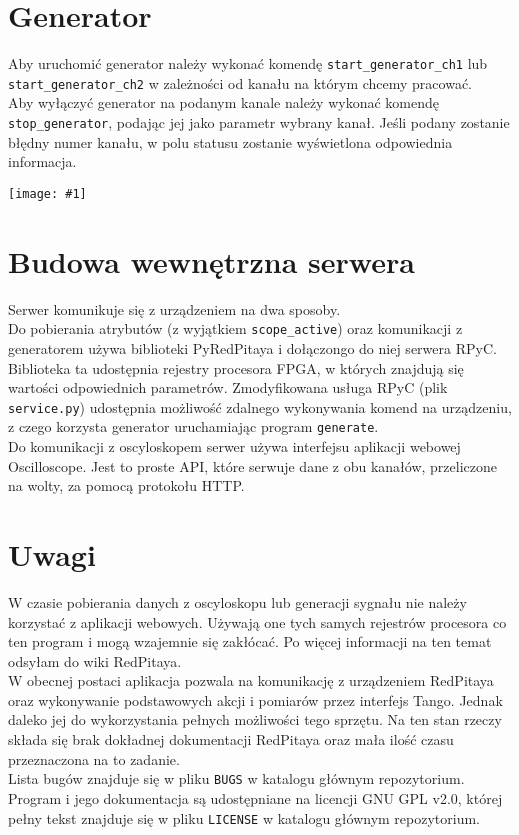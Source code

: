\documentclass[12pt,a4paper]{article}
\newcommand{\screenshot}[1]{\begin{minipage}[c]{\textwidth}\texttt{[image: \#1]}\end{minipage}}
\begin{document}
	\section{Generator}
	Aby uruchomić generator należy wykonać komendę \texttt{start\_generator\_ch1} lub \texttt{start\_generator\_ch2} w zależności od kanału na którym chcemy pracować.\\
	Aby wyłączyć generator na podanym kanale należy wykonać komendę \texttt{stop\_generator}, podając jej jako parametr wybrany kanał.
	Jeśli podany zostanie błędny numer kanału, w polu statusu zostanie wyświetlona odpowiednia informacja.\\
	\screenshot{screenshots/invalid_generator_channel.png}

	\section{Budowa wewnętrzna serwera}
	Serwer komunikuje się z urządzeniem na dwa sposoby.\\
	Do pobierania atrybutów (z wyjątkiem \texttt{scope\_active}) oraz komunikacji z generatorem używa biblioteki PyRedPitaya i dołączongo do niej serwera RPyC.
	Biblioteka ta udostępnia rejestry procesora FPGA, w których znajdują się wartości odpowiednich parametrów.
	Zmodyfikowana usługa RPyC (plik \texttt{service.py}) udostępnia możliwość zdalnego wykonywania komend na urządzeniu, z czego korzysta generator uruchamiając program \texttt{generate}.\\
	Do komunikacji z oscyloskopem serwer używa interfejsu aplikacji webowej Oscilloscope. Jest to proste API, które serwuje dane z obu kanałów, przeliczone na wolty, za pomocą protokołu HTTP.

	\section{Uwagi}
	W czasie pobierania danych z oscyloskopu lub generacji sygnału nie należy korzystać z aplikacji webowych. Używają one tych samych rejestrów procesora co ten program i mogą wzajemnie się zakłócać. Po więcej informacji na ten temat odsyłam do wiki RedPitaya.\\
	W obecnej postaci aplikacja pozwala na komunikację z urządzeniem RedPitaya oraz wykonywanie podstawowych akcji i pomiarów przez interfejs Tango.
	Jednak daleko jej do wykorzystania pełnych możliwości tego sprzętu. Na ten stan rzeczy składa się brak dokładnej dokumentacji RedPitaya oraz mała ilość czasu przeznaczona na to zadanie.\\
	Lista bugów znajduje się w pliku \texttt{BUGS} w katalogu głównym repozytorium.\\
	Program i jego dokumentacja są udostępniane na licencji GNU GPL v2.0, której pełny tekst znajduje się w pliku \texttt{LICENSE} w katalogu głównym repozytorium. 
\end{document}

